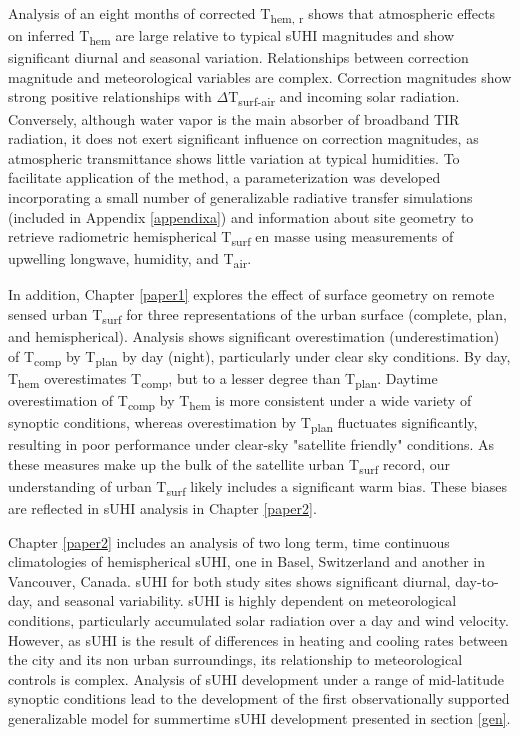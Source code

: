 \begin{bibunit}
Analysis of an eight months of corrected T\textsubscript{hem, r} shows that atmospheric effects on inferred T\textsubscript{hem} are large relative to typical sUHI magnitudes and show significant diurnal and seasonal variation. Relationships between correction magnitude and meteorological variables are complex. Correction magnitudes show strong positive relationships with $\Delta$T\textsubscript{surf-air} and incoming solar radiation. Conversely, although water vapor is the main absorber of broadband TIR radiation, it does not exert significant influence on correction magnitudes, as atmospheric transmittance shows little variation at typical humidities. To facilitate application of the method, a parameterization was developed incorporating a small number of generalizable radiative transfer simulations (included in Appendix \ref{appendixa}) and information about site geometry to retrieve radiometric hemispherical T\textsubscript{surf} en masse using measurements of upwelling longwave, humidity, and T\textsubscript{air}. 

In addition, Chapter \ref{paper1} explores the effect of surface geometry on remote sensed urban T\textsubscript{surf} for three representations of the urban surface (complete, plan, and hemispherical). Analysis shows significant overestimation (underestimation) of T\textsubscript{comp} by T\textsubscript{plan} by day (night), particularly under clear sky conditions. By day, T\textsubscript{hem} overestimates T\textsubscript{comp}, but to a lesser degree than T\textsubscript{plan}. Daytime overestimation of T\textsubscript{comp} by T\textsubscript{hem} is more consistent under a wide variety of synoptic conditions, whereas overestimation by T\textsubscript{plan} fluctuates significantly, resulting in poor performance under clear-sky "satellite friendly" conditions. As these measures make up the bulk of the satellite urban T\textsubscript{surf} record, our understanding of urban T\textsubscript{surf} likely includes a significant warm bias. These biases are reflected in sUHI analysis in Chapter \ref{paper2}.

Chapter \ref{paper2} includes an analysis of two long term, time continuous climatologies of hemispherical sUHI, one in Basel, Switzerland and another in Vancouver, Canada. sUHI for both study sites shows significant diurnal, day-to-day, and seasonal variability. sUHI is highly dependent on meteorological conditions, particularly accumulated solar radiation over a day and wind velocity. However, as sUHI is the result of differences in heating and cooling rates between the city and its non urban surroundings, its relationship to meteorological controls is complex. Analysis of sUHI development under a range of mid-latitude synoptic conditions lead to the development of the first observationally supported generalizable model for summertime sUHI development presented in section \ref{gen}.


\end{bibunit}
